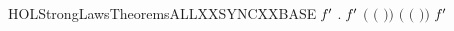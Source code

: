 \newcommand{\HOLStrongLawsDefinitionsSYNCXXdef}{\UseVerbatim{HOLStrongLawsDefinitionsSYNCXXdef}}
\newcommand{\HOLStrongLawsDefinitions}{
\HOLDfnTag{StrongLaws}{ALL_SYNC_def}\HOLStrongLawsDefinitionsALLXXSYNCXXdef
\HOLDfnTag{StrongLaws}{CCS_COMP_def}\HOLStrongLawsDefinitionsCCSXXCOMPXXdef
\HOLDfnTag{StrongLaws}{CCS_SIGMA_def}\HOLStrongLawsDefinitionsCCSXXSIGMAXXdef
\HOLDfnTag{StrongLaws}{Is_Prefix_def}\HOLStrongLawsDefinitionsIsXXPrefixXXdef
\HOLDfnTag{StrongLaws}{PREF_ACT_def}\HOLStrongLawsDefinitionsPREFXXACTXXdef
\HOLDfnTag{StrongLaws}{PREF_PROC_def}\HOLStrongLawsDefinitionsPREFXXPROCXXdef
\HOLDfnTag{StrongLaws}{SYNC_def}\HOLStrongLawsDefinitionsSYNCXXdef
}
\begin{SaveVerbatim}{HOLStrongLawsTheoremsALLXXSYNCXXBASE}
\HOLTokenTurnstile{} \HOLSymConst{\HOLTokenForall{}} \ensuremath{\HOLBoundVar{f}\sp{\prime}} .
          \ensuremath{\HOLBoundVar{f}\sp{\prime}}  \HOLSymConst{\ensuremath{=}}
        \ensuremath{(} \ensuremath{(} \ensuremath{)}\ensuremath{)} \ensuremath{(} \ensuremath{(} \ensuremath{)}\ensuremath{)} \ensuremath{\HOLBoundVar{f}\sp{\prime}} 
\end{SaveVerbatim}
\newcommand{\HOLStrongLawsTheoremsALLXXSYNCXXBASE}{\UseVerbatim{HOLStrongLawsTheoremsALLXXSYNCXXBASE}}
